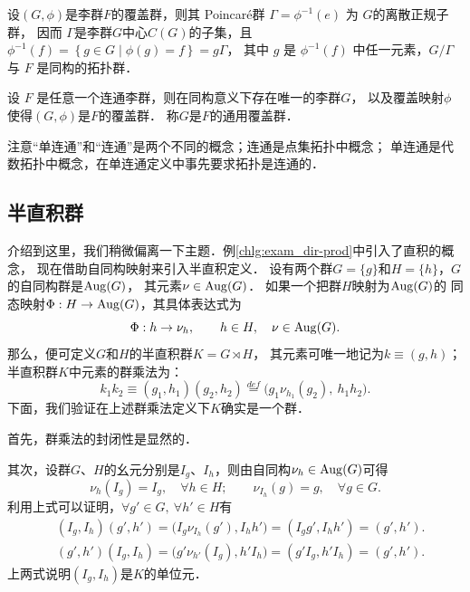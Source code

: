 \begin{theorem}
    设$(G, \phi)$是李群$F$的覆盖群，则其 Poincar\'e群 $\Gamma=\phi^{-1}(e)$ 为 $G$的{\heiti 离散正规子群}，
    因而 $\Gamma$是李群$G$中心$C (G)$的子集，且 $\phi^{-1}(f)=\left\{g \in G \mid \phi(g)=f\right\}=g \Gamma$，
    其中 $g$ 是 $\phi^{-1}(f)$ 中任一元素，$G / \Gamma$ 与 $F$ 是同构的拓扑群．
\end{theorem}

\begin{theorem}
    设 $F$ 是任意一个连通李群，则在同构意义下存在唯一的李群$G$，
    以及覆盖映射$\phi$使得$(G,\phi)$是$F$的覆盖群．    
    称$G$是$F$的{\heiti 通用覆盖群}．
\end{theorem}


注意“单连通”和“连通”是两个不同的概念；连通是点集拓扑中概念；
单连通是代数拓扑中概念，在单连通定义中事先要求拓扑是连通的．



\subsection{半直积群}\label{chlg:sec_semi-dir-prod}
介绍到这里，我们稍微偏离一下主题．例\ref{chlg:exam_dir-prod}中引入了{\kaishu 直积}的概念，
现在借助自同构映射来引入{\kaishu 半直积}定义．
设有两个群$G=\{g\}$和$H=\{h\}$，$G$的自同构群是${\rm Aug}(G)$，
其元素$\nu \in {\rm Aug}(G)$．
如果一个把群$H$映射为${\rm Aug}(G)$的
同态映射$\Phi:H\to {\rm Aug}(G)$，其具体表达式为
\begin{equation}
    \Phi : h \to \nu_h ,\qquad h\in H,\quad \nu \in {\rm Aug}(G).
\end{equation}
那么，便可定义$G$和$H$的{\heiti 半直积群}$K=G  \rtimes H$，
其元素可唯一地记为$k\equiv (g,h)$； %
半直积群$K$中元素的群乘法为：
\begin{equation}\label{chlg:eqn_semi-dir-prod}
    k_1 k_2 \equiv (g_1, h_1) (g_2, h_2)
    \overset{def}{=} \bigl(g_1 \nu_{h_1}(g_2),\ h_1 h_2 \bigr) .
\end{equation}
下面，我们验证在上述群乘法定义下$K$确实是一个群．

首先，群乘法的封闭性是显然的．

其次，设群$G$、$H$的幺元分别是$I_g$、$I_h$，则由自同构$\nu_h\in {\rm Aug}(G)$可得
\begin{equation}
    \nu_h (I_g)   =I_g, \quad  \forall h\in H ; \qquad
    \nu_{I_h} (g) = g,  \quad  \forall g\in G .
\end{equation}
利用上式可以证明，$\forall g'\in G,\ \forall h'\in H$有
\begin{align}
    &( I_g, I_h ) (g', h') = \bigl( I_g \nu_{I_h}(g'), I_h h' \bigr)
    = ( I_g g', I_h h') =( g' ,h'). \\
    & ( g' ,h' )( I_g, I_h ) = \bigl(g'  \nu_{h'}( I_g), h' I_h \bigr)
    =(g' I_g,  h' I_h) =( g', h').
\end{align}
上两式说明$( I_g, I_h) $是$K$的{\kaishu 单位元}．

